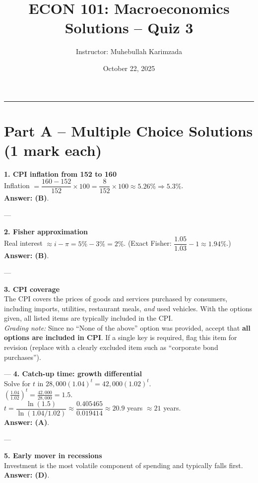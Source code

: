 \documentclass[12pt]{article}
\title{ECON 101: Macroeconomics \\ Solutions -- Quiz 3}
\author{Instructor: Muhebullah Karimzada}
\date{October 22,  2025}
\begin{document}
\maketitle

\hrule
\vspace{1em}

\section*{Part A – Multiple Choice Solutions (1 mark each)}

\textbf{1. CPI inflation from 152 to 160} \\
Inflation $= \dfrac{160 - 152}{152}\times 100 = \dfrac{8}{152}\times 100 \approx 5.26\% \Rightarrow 5.3\%$.\\
\textbf{Answer: (B)}.

---

\textbf{2. Fisher approximation} \\
Real interest $\approx i - \pi = 5\% - 3\% = 2\%$. (Exact Fisher: $\dfrac{1.05}{1.03}-1 \approx 1.94\%$.) \\
\textbf{Answer: (B)}.

---

\textbf{3. CPI coverage} \\
The CPI covers the prices of goods and services purchased by consumers, including imports, utilities, restaurant meals, \emph{and} used vehicles. With the options given, all listed items are typically included in the CPI. \\
\emph{Grading note:} Since no ``None of the above'' option was provided, accept that \textbf{all options are included in CPI}. If a single key is required, flag this item for revision (replace with a clearly excluded item such as ``corporate bond purchases''). 

---
\newpage
\textbf{4. Catch-up time: growth differential} \\
Solve for $t$ in $28{,}000(1.04)^t = 42{,}000(1.02)^t$.\\
$\displaystyle \left(\frac{1.04}{1.02}\right)^t = \frac{42{,}000}{28{,}000} = 1.5$.\\
$t = \dfrac{\ln(1.5)}{\ln(1.04/1.02)} \approx \dfrac{0.405465}{0.019414} \approx 20.9$ years $\approx 21$ years.\\
\textbf{Answer: (A)}.

---

\textbf{5. Early mover in recessions} \\
Investment is the most volatile component of spending and typically falls first. \\
\textbf{Answer: (D)}.
\end{document}
